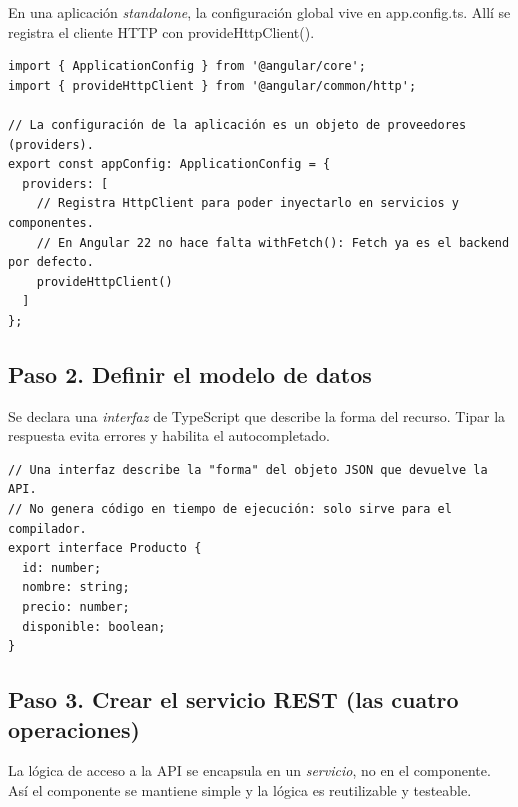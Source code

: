\documentclass[11pt,a4paper]{article}
\newcommand{\code}[1]{{\ttfamily\color{ngdark}#1}}
\begin{document}
En una aplicación \emph{standalone}, la configuración global vive en \code{app.config.ts}. Allí se registra el cliente HTTP con \code{provideHttpClient()}.

\begin{lstlisting}[caption={\texttt{src/app/app.config.ts} --- registro del cliente HTTP.},label={lst:config}]
import { ApplicationConfig } from '@angular/core';
import { provideHttpClient } from '@angular/common/http';

// La configuración de la aplicación es un objeto de proveedores (providers).
export const appConfig: ApplicationConfig = {
  providers: [
    // Registra HttpClient para poder inyectarlo en servicios y componentes.
    // En Angular 22 no hace falta withFetch(): Fetch ya es el backend por defecto.
    provideHttpClient()
  ]
};
\end{lstlisting}

\subsection*{Paso 2. Definir el modelo de datos}

Se declara una \emph{interfaz} de TypeScript que describe la forma del recurso. Tipar la respuesta evita errores y habilita el autocompletado.

\begin{lstlisting}[caption={\texttt{src/app/producto.model.ts} --- contrato de datos.},label={lst:modelo}]
// Una interfaz describe la "forma" del objeto JSON que devuelve la API.
// No genera código en tiempo de ejecución: solo sirve para el compilador.
export interface Producto {
  id: number;
  nombre: string;
  precio: number;
  disponible: boolean;
}
\end{lstlisting}

\subsection*{Paso 3. Crear el servicio REST (las cuatro operaciones)}

La lógica de acceso a la API se encapsula en un \emph{servicio}, no en el componente. Así el componente se mantiene simple y la lógica es reutilizable y testeable.
\end{document}
